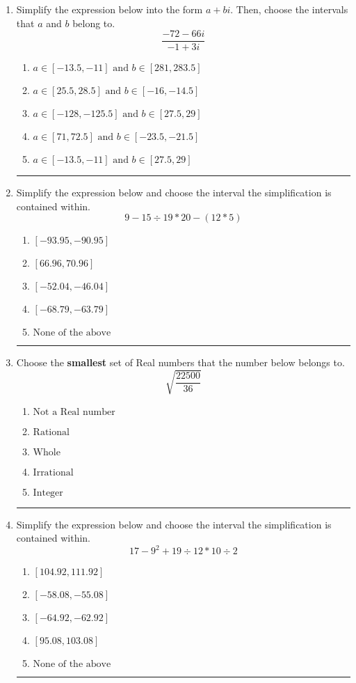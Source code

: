 \documentclass[14pt]{extbook}
\newcommand{\litem}[1]{\item#1\hspace*{-1cm}\rule{\textwidth}{0.4pt}}
\begin{document}
\begin{enumerate}
{\begin{enumerate}[label=\Alph*.]
\end{enumerate} }
\litem{
Simplify the expression below into the form $a+bi$. Then, choose the intervals that $a$ and $b$ belong to.\[ \frac{-72 - 66 i}{-1 + 3 i} \]\begin{enumerate}[label=\Alph*.]
\item \( a \in [-13.5, -11] \text{ and } b \in [281, 283.5] \)
\item \( a \in [25.5, 28.5] \text{ and } b \in [-16, -14.5] \)
\item \( a \in [-128, -125.5] \text{ and } b \in [27.5, 29] \)
\item \( a \in [71, 72.5] \text{ and } b \in [-23.5, -21.5] \)
\item \( a \in [-13.5, -11] \text{ and } b \in [27.5, 29] \)

\end{enumerate} }
\litem{
Simplify the expression below and choose the interval the simplification is contained within.\[ 9 - 15 \div 19 * 20 - (12 * 5) \]\begin{enumerate}[label=\Alph*.]
\item \( [-93.95, -90.95] \)
\item \( [66.96, 70.96] \)
\item \( [-52.04, -46.04] \)
\item \( [-68.79, -63.79] \)
\item \( \text{None of the above} \)

\end{enumerate} }
\litem{
Choose the \textbf{smallest} set of Real numbers that the number below belongs to.\[ \sqrt{\frac{22500}{36}} \]\begin{enumerate}[label=\Alph*.]
\item \( \text{Not a Real number} \)
\item \( \text{Rational} \)
\item \( \text{Whole} \)
\item \( \text{Irrational} \)
\item \( \text{Integer} \)

\end{enumerate} }
\litem{
Simplify the expression below and choose the interval the simplification is contained within.\[ 17 - 9^2 + 19 \div 12 * 10 \div 2 \]\begin{enumerate}[label=\Alph*.]
\item \( [104.92, 111.92] \)
\item \( [-58.08, -55.08] \)
\item \( [-64.92, -62.92] \)
\item \( [95.08, 103.08] \)
\item \( \text{None of the above} \)


\end{enumerate}}
\end{enumerate}
\end{document}
